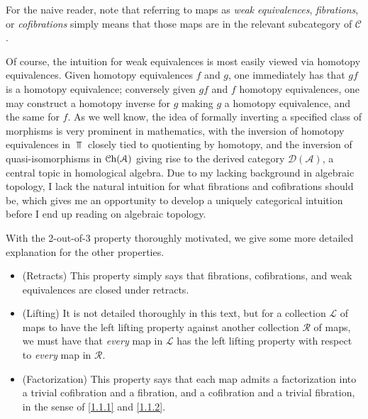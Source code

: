 \begin{remark}\label{1.1.7}
	For the naive reader, note that referring to maps as \emph{weak equivalences}, \emph{fibrations}, or \emph{cofibrations} simply means that those maps are in the relevant subcategory of $\mathcal{C} $.

	Of course, the intuition for weak equivalences is most easily viewed via homotopy equivalences. Given homotopy equivalences $f$ and $g$, one immediately has that $gf$ is a homotopy equivalence; conversely given $gf$ and $f$ homotopy equivalences, one may construct a homotopy inverse for $g$ making $g$ a homotopy equivalence, and the same for $f$. As we well know, the idea of formally inverting a specified class of morphisms is very prominent in mathematics, with the inversion of homotopy equivalences in $\Top $ closely tied to quotienting by homotopy, and the inversion of quasi-isomorphisms in $\mathcal{C}\mathrm{h}(\mathcal{A} )$ giving rise to the derived category $\mathcal{D} (\mathcal{A} )$, a central topic in homological algebra. Due to my lacking background in algebraic topology, I lack the natural intuition for what fibrations and cofibrations should be, which gives me an opportunity to develop a uniquely categorical intuition before I end up reading on algebraic topology.

	With the 2-out-of-3 property thoroughly motivated, we give some more detailed explanation for the other properties.
	\begin{itemize}
		\item (Retracts) This property simply says that fibrations, cofibrations, and weak equivalences are closed under retracts.
		\item (Lifting) It is not detailed thoroughly in this text, but for a collection $\mathcal{L}$ of maps to have the left lifting property against another collection $\mathcal{R} $ of maps, we must have that \emph{every} map in $\mathcal{L} $ has the left lifting property with respect to \emph{every} map in $\mathcal{R} $.
		\item (Factorization) This property says that each map admits a factorization into a trivial cofibration and a fibration, and a cofibration and a trivial fibration, in the sense of \cref{1.1.1} and \cref{1.1.2}.
	\end{itemize}
\end{remark}

